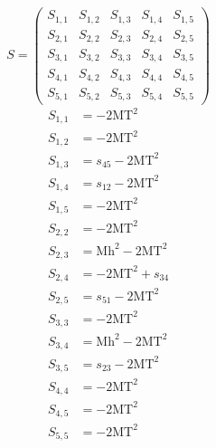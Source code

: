\documentclass[a4paper]{article}
\begin{document}
\begin{equation}
S=\left(\begin{array}{ccccc}
   S_{1,1}&
   S_{1,2}&
   S_{1,3}&
   S_{1,4}&
   S_{1,5}\\
   S_{2,1}&
   S_{2,2}&
   S_{2,3}&
   S_{2,4}&
   S_{2,5}\\
   S_{3,1}&
   S_{3,2}&
   S_{3,3}&
   S_{3,4}&
   S_{3,5}\\
   S_{4,1}&
   S_{4,2}&
   S_{4,3}&
   S_{4,4}&
   S_{4,5}\\
   S_{5,1}&
   S_{5,2}&
   S_{5,3}&
   S_{5,4}&
   S_{5,5}\end{array}\right)
\end{equation}
\begin{subequations}
\begin{align}
   S_{1,1}&=-2\text{MT}^2\\
   S_{1,2}&=-2\text{MT}^2\\
   S_{1,3}&=s_{45}-2\text{MT}^2\\
   S_{1,4}&=s_{12}-2\text{MT}^2\\
   S_{1,5}&=-2\text{MT}^2\\
   S_{2,2}&=-2\text{MT}^2\\
   S_{2,3}&=\text{Mh}^2-2\text{MT}^2\\
   S_{2,4}&=-2\text{MT}^2+s_{34}\\
   S_{2,5}&=s_{51}-2\text{MT}^2\\
   S_{3,3}&=-2\text{MT}^2\\
   S_{3,4}&=\text{Mh}^2-2\text{MT}^2\\
   S_{3,5}&=s_{23}-2\text{MT}^2\\
   S_{4,4}&=-2\text{MT}^2\\
   S_{4,5}&=-2\text{MT}^2\\
   S_{5,5}&=-2\text{MT}^2
\end{align}
\end{subequations}
\end{document}
